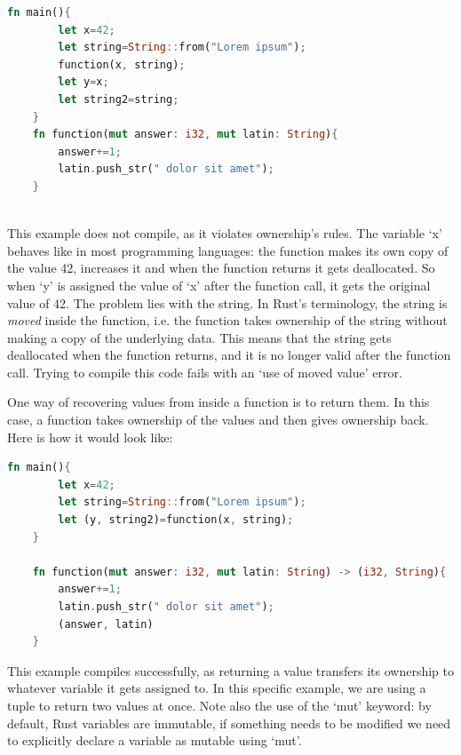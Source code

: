 \documentclass{report}
\begin{document}
\begin{lstlisting}[language=Rust, style=colouredRust]
	fn main(){
		let x=42;
		let string=String::from("Lorem ipsum");
		function(x, string);
		let y=x;
		let string2=string;
	}
	fn function(mut answer: i32, mut latin: String){
		answer+=1;
		latin.push_str(" dolor sit amet");
	}
	
\end{lstlisting}

This example does not compile, as it violates ownership's rules. The variable \enquote*{x} behaves like in most programming languages: the function makes its own copy of the value
42, increases it and when the function returns it gets deallocated. So when \enquote*{y} is assigned the value of \enquote*{x} after the function call, it gets the original value
of 42. The problem lies with the string. In Rust's terminology, the string is \textit{moved} inside the function, i.e. the function takes ownership of the string without making a
copy of the underlying data. This means that the string gets deallocated when the function returns, and it is no longer valid after the function call. Trying to compile this code
fails with an \enquote*{use of moved value} error.\par

One way of recovering values from inside a function is to return them. In this case, a function takes ownership of the values and then gives ownership back. Here is how it would
look like:

\begin{lstlisting}[language=Rust, style=colouredRust]
    fn main(){
    	let x=42;
        let string=String::from("Lorem ipsum");
        let (y, string2)=function(x, string);
    }

    fn function(mut answer: i32, mut latin: String) -> (i32, String){
        answer+=1;
        latin.push_str(" dolor sit amet");
        (answer, latin)
    }          
\end{lstlisting}

This example compiles successfully, as returning a value transfers its ownership to whatever variable it gets assigned to. In this specific example, we are using a tuple to return
two values at once. Note also the use of the \enquote*{mut} keyword: by default, Rust variables are immutable, if something needs to be modified we need to explicitly declare a
variable as mutable using \enquote*{mut}. \par
\end{document}
